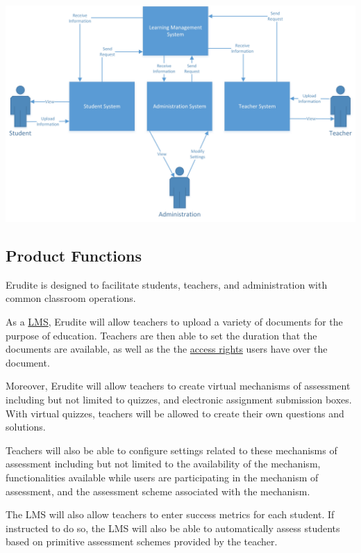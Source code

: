 \documentclass[]{article}
\begin{document}
\begin{center}
\includegraphics[scale=0.7]{A1_Assets/2-1_Product_Perspective_Diagram.jpg}
\end{center}


\subsection{Product Functions}
\label{sub:product_functions}
Erudite is designed to facilitate students, teachers, and administration
with common classroom operations.

As a \underline{LMS}, Erudite will allow teachers to upload a variety of documents for
the purpose of education. Teachers are then able to set the duration that the
documents are available, as well as the the \underline{access rights} users
have over the document.

Moreover, Erudite will allow teachers to create virtual mechanisms of
assessment including but not limited to quizzes, and electronic assignment
submission boxes. With virtual quizzes, teachers will be allowed to create their
own questions and solutions.

Teachers will also be able to configure settings related to these mechanisms of
assessment including but not limited to the availability of the mechanism,
functionalities available while users are participating in the mechanism of
assessment, and the assessment scheme associated with the mechanism.

The LMS will also allow teachers to enter success metrics for each student. If
instructed to do so, the LMS will also be able to automatically assess students
based on primitive assessment schemes provided by the teacher.
\end{document}
